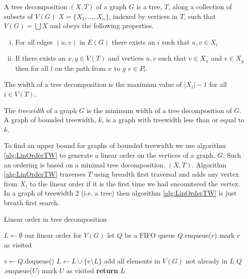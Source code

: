 \begin{definition}
    A tree decomposition $(X,T)$ of a graph $G$ is a tree, $T$, along a collection of subsets of $V(G)$ $X=\{X_1,\dots,X_n\}$, indexed by vertices in $T$, such that $V(G)=\bigcup X$ and obeys the following properties.
    \begin{enumerate}[(i)]
        \item For all edges $(u,v)$ in $E(G)$ there exists an $i$ such that $u,v\in X_i$
        \item  If there exists an $x,y\in V(T)$ and vertices $u,v$ such that $v\in X_x$ and $v\in X_y$ then for all $l$ on the path from $x$ to $y$ $v\in P_l$.
    \end{enumerate} 
    The width of a tree decomposition is the maximum value of $|X_i| -1$ for all $i\in V(T)$.
\end{definition}

\begin{definition}[Treewidth]
    The \textit{treewidth} of a graph $G$ is the minimum width of a tree decomposition of $G$.    
    A graph of bounded treewidth, $k$, is a graph with treewidth less than or equal to $k$. 
\end{definition}

To find an upper bound for graphs of bounded treewidth we use algorithm \ref{alg:LinOrderTW} to generate a linear order on the vertices of a graph, $G$. Such an ordering is based on a minimal tree decomposition, $(X,T)$. Algorithm \ref{alg:LinOrderTW} traverses $T$ using breadth first traversal and adds any vertex from $X_i$ to the linear order if it is the first time we  had encountered the vertex. In a graph of treewidth 2 (i.e. a tree) then algorithm \ref{alg:LinOrderTW} is just breath first search.

\begin{algorithm}[h]
    \caption{Linear order in tree decomposition}
    \label{alg:LinOrderTW}
    \begin{algorithmic}[1]
        
            \State $L \gets \emptyset$ \Comment our linear order for $V(G)$
            \State let $Q$ be a FIFO queue 
            \State $Q$.enqueue($r$)
            \State mark $r$ as visited
            
                \State $v \gets Q$.dequeue()
                \State $L \gets L \cup \{v\setminus L\}$ \Comment add all elements in $V(G)$ not already in $L$
                    \State $Q$.enqueue($U$)
                    \State mark $U$ as visited
                \EndFor        
            \EndWhile 
            \State \textbf{return}  $L$
        \EndFunction
    \end{algorithmic}
\end{algorithm}

